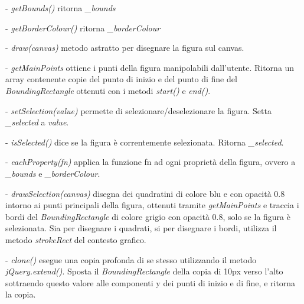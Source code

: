\begin{elencopuntato}[\subsubsecindent]
\item[-] \textit{getBounds()} ritorna \textit{{\_}bounds}
\item[-] \textit{getBorderColour()} ritorna \textit{{\_}borderColour}
\item[-]  \textit{draw(canvas)} metodo astratto per disegnare la figura sul canvas.
\item[-]  \textit{getMainPoints} ottiene i punti della figura manipolabili dall'utente. Ritorna un array contenente copie del punto di inizio e del punto di fine del \textit{BoundingRectangle} ottenuti con i metodi \textit{start()} e \textit{end()}.
\item[-]  \textit{setSelection(value)} permette di selezionare/deselezionare la figura. Setta \textit{{\_}selected} a \textit{value}.
\item[-]  \textit{isSelected()} dice se la figura \`e correntemente selezionata. Ritorna \textit{{\_}selected}.
\item[-]  \textit{eachProperty(fn)} applica la funzione fn ad ogni propriet\`a della figura, ovvero a \textit{{\_}bounds} e \textit{{\_}borderColour}.
\item[-] \textit{drawSelection(canvas)} disegna dei quadratini di colore blu e con opacit\`a 0.8 intorno ai punti principali della figura, ottenuti tramite \textit{getMainPoints} e traccia i bordi del \textit{BoundingRectangle} di colore grigio con opacit\`a 0.8, solo se la figura \`e selezionata. Sia per disegnare i quadrati, si per disegnare i bordi, utilizza il metodo \textit{strokeRect} del contesto grafico.
\item[-] \textit{clone()} esegue una copia profonda di se stesso utilizzando il metodo \textit{jQuery.extend()}. Sposta il \textit{BoundingRectangle} della copia di 10px verso l'alto sottraendo questo valore alle componenti y dei punti di inizio e di fine, e ritorna la copia.
\end{elencopuntato}

